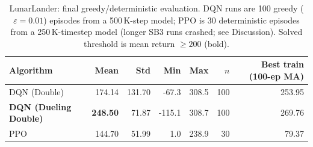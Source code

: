 \begin{table}[h]\centering\small
\caption{LunarLander: final greedy/deterministic evaluation. DQN runs are 100 greedy ($\varepsilon=0.01$) episodes from a 500\,K-step model; PPO is 30 deterministic episodes from a 250\,K-timestep model (longer SB3 runs crashed; see Discussion). Solved threshold is mean return $\geq 200$ (bold).}
\label{tab:lander_final}
\begin{tabular}{lrrrrrr}
\toprule
Algorithm & Mean & Std & Min & Max & $n$ & Best train (100-ep MA) \\
\midrule
DQN (Double) & 174.14 & 131.70 & -67.3 & 308.5 & 100 & 253.95 \\
\textbf{DQN (Dueling Double)} & \textbf{248.50} & 71.87 & -115.1 & 308.7 & 100 & 269.76 \\
PPO & 144.70 & 51.99 & 1.0 & 238.9 & 30 & 79.37 \\
\bottomrule
\end{tabular}
\end{table}
